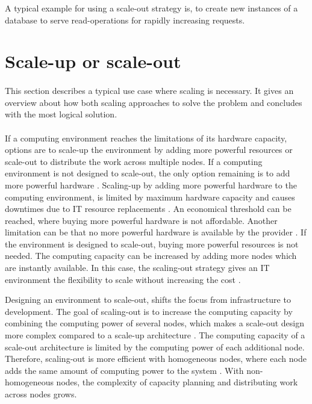 \documentclass{article}
\begin{document}
A typical example for using a scale-out strategy is, to create new instances of a database to serve read-operations for rapidly increasing requests.


\section{Scale-up or scale-out}
\paragraph{}
This section describes a typical use case where scaling is necessary. It gives an overview about how both scaling approaches to solve the problem and concludes with the most logical solution.


\paragraph{}
If a computing environment reaches the limitations of its hardware capacity, options are to scale-up the environment by adding more powerful resources or scale-out to distribute the work across multiple nodes. If a computing environment is not designed to scale-out, the only option remaining is to add more powerful hardware \cite{Abbot2011ScalabilityRules}.
Scaling-up by adding more powerful hardware to the computing environment, is limited by maximum hardware capacity and causes downtimes due to IT resource replacements \cite{Mahmood2013CloudConcepts}. An economical threshold can be reached, where buying more powerful hardware is not affordable. Another limitation can be that no more powerful hardware is available by the provider \cite{Abbot2011ScalabilityRules, Wilder2012CloudPatterns}.
If the environment is designed to scale-out, buying more powerful resources is not needed. The computing capacity can be increased by adding more nodes which are instantly available. In this case, the scaling-out strategy gives an IT environment the flexibility to scale without increasing the cost \cite{Abbot2011ScalabilityRules}.


Designing an environment to scale-out, shifts the focus from infrastructure to development. The goal of scaling-out is to increase the computing capacity by combining the computing power of several nodes, which makes a scale-out design more complex compared to a scale-up architecture \cite{Wilder2012CloudPatterns}. The computing capacity of a scale-out architecture is limited by the computing power of each additional node. Therefore, scaling-out is more efficient with homogeneous nodes, where each node adds the same amount of computing power to the system \cite{Wilder2012CloudPatterns}. With non-homogeneous nodes, the complexity of capacity planning and distributing work across nodes grows.
\end{document}
